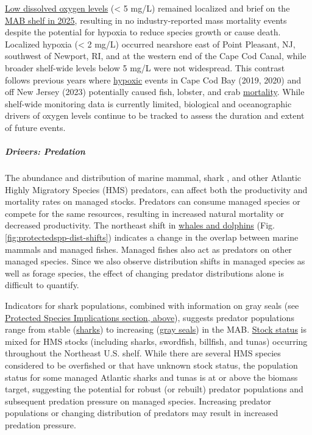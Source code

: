 \documentclass[
  10pt,
]{article}
\begin{document}
\href{https://noaa-edab.github.io/catalog/dissolved_oxygen.html}{Low dissolved oxygen levels} (\textless{} 5 mg/L) remained localized and brief on the \href{https://noaa-edab.github.io/catalog/observation_synthesis_2023.html}{MAB shelf in 2025}, resulting in no industry-reported mass mortality events despite the potential for hypoxia to reduce species growth or cause death. Localized hypoxia (\textless{} 2 mg/L) occurred nearshore east of Point Pleasant, NJ, southwest of Newport, RI, and at the western end of the Cape Cod Canal, while broader shelf-wide levels below 5 mg/L were not widespread. This contrast follows previous years where \href{https://noaa-edab.github.io/catalog/observation_synthesis_2023.html}{hypoxic} events in Cape Cod Bay (2019, 2020) and off New Jersey (2023) potentially caused fish, lobster, and crab \href{https://sebsnjaesnews.rutgers.edu/2023/12/rutgers-scientists-observe-unusual-ocean-conditions-possibly-linked-to-mortality-in-marine-life-off-new-jersey/}{mortality}. While shelf-wide monitoring data is currently limited, biological and oceanographic drivers of oxygen levels continue to be tracked to assess the duration and extent of future events.

\subparagraph{Drivers: Predation}\label{drivers-predation}

The abundance and distribution of marine mammal, shark , and other Atlantic Highly Migratory Species (HMS) predators, can affect both the productivity and mortality rates on managed stocks. Predators can consume managed species or compete for the same resources, resulting in increased natural mortality or decreased productivity. The northeast shift in \href{https://noaa-edab.github.io/catalog/cetacean_dist.html}{whales and dolphins} (Fig. \ref{fig:protectedspp-dist-shifts}) indicates a change in the overlap between marine mammals and managed fishes. Managed fishes also act as predators on other managed species. Since we also observe distribution shifts in managed species as well as forage species, the effect of changing predator distributions alone is difficult to quantify.

Indicators for shark populations, combined with information on gray seals (see \hyperref[protected-species]{Protected Species Implications section, above}), suggests predator populations range from stable (\href{https://noaa-edab.github.io/catalog/hms_cpue.html}{sharks}) to increasing (\href{https://noaa-edab.github.io/catalog/seal_pups.html}{gray seals}) in the MAB. \href{https://noaa-edab.github.io/catalog/hms_stock_status.html}{Stock status} is mixed for HMS stocks (including sharks, swordfish, billfish, and tunas) occurring throughout the Northeast U.S. shelf. While there are several HMS species considered to be overfished or that have unknown stock status, the population status for some managed Atlantic sharks and tunas is at or above the biomass target, suggesting the potential for robust (or rebuilt) predator populations and subsequent predation pressure on managed species. Increasing predator populations or changing distribution of predators may result in increased predation pressure.
\end{document}
